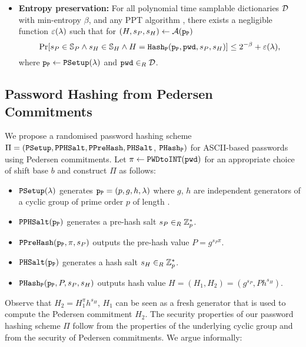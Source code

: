 \begin{itemize}
\item \textbf{Entropy preservation:} 
    For all polynomial time samplable dictionaries $\mathcal{D}$ with min-entropy $\beta$, and any \ac{PPT} algorithm \cA, there exists a negligible function $\varepsilon(\lambda)$ such that for $(H,s_P,s_H)\gets \mathcal{A}(\mathtt{p_P})$
      \[\Pr[s_P\in\mathbb{S}_P \wedge s_H\in\mathbb{S}_H \wedge H=\mathtt{Hash_P}(\mathtt{p_P},\mathtt{pwd},s_P,s_H)] \leq 2^{-\beta} + \varepsilon(\lambda),\]
      where $\mathtt{p_P}\gets\mathtt{PSetup}(\lambda)$ and $\mathtt{pwd}\in_R\mathcal{D}$.
\end{itemize}

\subsection{Password Hashing from Pedersen Commitments}\label{sec:pwhashped}
We propose a randomised password hashing scheme $\Pi=(\mathtt{PSetup},\mathtt{PPHSalt},\allowbreak\mathtt{PPreHash},\allowbreak\mathtt{PHSalt}$, $\mathtt{PHash_P})$ for \ac{ASCII}-based passwords using Pedersen commitments. 
Let $\pi\gets\texttt{PWDtoINT}(\mathtt{pwd})$ for an appropriate choice of shift base $b$ and construct $\Pi$ as follows:

\begin{itemize}
	\item $\mathtt{PSetup}(\lambda)$ generates $\mathtt{p_P}= (p,g,h,\lambda)$ where $g$, $h$ are independent generators of a cyclic group \GG of prime order $p$ of length \secpar.
	\item $\mathtt{PPHSalt}(\mathtt{p_P})$ generates a pre-hash salt $s_P\in_R\mathbb{Z}^\ast_p$.
	\item $\mathtt{PPreHash}(\mathtt{p_P}, \pi, s_P)$ outputs the pre-hash value $P=g^{s_P\pi}$.
	\item $\mathtt{PHSalt}(\mathtt{p_P})$ generates a hash salt $s_H\in_R\mathbb{Z}^\ast_p$.
	\item $\mathtt{PHash_P}(\mathtt{p_P}, P, s_P, s_H)$ outputs hash value $H=(H_1, H_2)=(g^{s_P}, Ph^{s_H})$.
\end{itemize}

\noindent
Observe that $H_2=H_1^\pi h^{s_H}$, \ie $H_1$ can be seen as a fresh generator that is used to compute the Pedersen commitment $H_2$.
The security properties of our password hashing scheme $\Pi$ follow from the properties of the underlying cyclic group \GG and from the security of Pedersen commitments. 
We argue informally:

